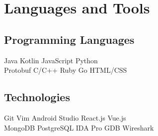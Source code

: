 \documentclass[]{template}
\begin{document}
\section{Languages and Tools}
\begin{minipage}[t]{.45\textwidth}
\subsection{Programming Languages}
Java
\textbullet{} Kotlin
\textbullet{} JavaScript
\textbullet{} Python
\\ %
Protobuf
\textbullet{} C/C++
\textbullet{} Ruby
\textbullet{} Go
\textbullet{} HTML/CSS
\sectionsep
\end{minipage}
\hfill
\begin{minipage}[t]{.45\textwidth}
\subsection{Technologies}
Git
\textbullet{} Vim
\textbullet{} Android Studio
\textbullet{} React.js
\textbullet{} Vue.js
\\ %
MongoDB
\textbullet{} PostgreSQL
\textbullet{} IDA  Pro
\textbullet{} GDB
\textbullet{} Wireshark
\end{minipage}
\end{document}
